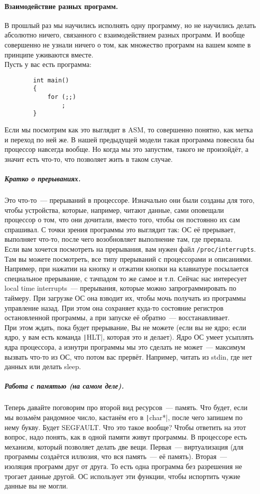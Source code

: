 \documentclass{article}
\begin{document}
    \paragraph{Взаимодействие разных программ.}
    В прошлый раз мы научились исполнять одну программу, но не научились делать абсолютно ничего, связанного с взаимодействием разных программ. И вообще совершенно не узнали ничего о том, как множество программ на вашем компе в принципе уживаются вместе.\\
    Пусть у вас есть программа:
    \begin{verbatim}
        int main()
        {
            for (;;)
                ;
        }
    \end{verbatim}
    Если мы посмотрим как это выглядит в ASM, то совершенно понятно, как метка и переход по ней же. В нашей предыдущей модели такая программа повесила бы процессор навсегда вообще. Но когда мы это запустим, такого не произойдёт, а значит есть что-то, что позволяет жить в таком случае.
    \subparagraph{Кратко о прерываниях.}
    Это что-то~--- прерываний в процессоре. Изначально они были созданы для того, чтобы устройства, которые, например, читают данные, сами оповещали процессор о том, что они дочитали, вместо того, чтобы он постоянно их сам спрашивал. С точки зрения программы это выглядит так: ОС её прерывает, выполняет что-то, после чего возобновляет выполнение там, где прервала.\\
    Если вам хочется посмотреть на прерывания, вам нужен файл \Verb|/proc/interrupts|. Там вы можете посмотреть, все типу прерываний с процессорами и описаниями. Например, при нажатии на кнопку и отжатии кнопки на клавиатуре посылается специальное прерывание, с тачпадом то же самое и т.п. Сейчас нас интересует local time interrupts~--- прерывания, которые можно запрограммировать по таймеру. При загрузке ОС она взводит их, чтобы мочь получать из программы управление назад. При этом она сохраняет куда-то состояние регистров остановленной программы, а при запуске её обратно~--- восстанавливает.\\
    При этом ждать, пока будет прерывание, Вы не можете (если вы не ядро; если ядро, у вам есть команда \texttt|HLT|, которая это и делает). Ядро ОС умеет усыплять ядра процессора, а изнутри программы мы это сделать не может~--- максимум вызвать что-то из ОС, что потом вас прервёт. Например, читать из stdin, где нет данных или делать sleep.
    \subparagraph{Работа с памятью (на самом деле).}
    Теперь давайте поговорим про второй вид ресурсов~--- память. Что будет, если мы возьмём рандомное число, кастанём его в \texttt|char*|, после чего запишем по нему букву. Будет SEGFAULT. Что это такое вообще? Чтобы ответить на этот вопрос, надо понять, как в одной памяти живут программы. В процессоре есть механизм, который позволяет делать две вещи. Первая~--- виртуализация (для программы создаётся иллюзия, что вся память~--- её память). Вторая~--- изоляция программ друг от друга. То есть одна программа без разрешения не трогает данные другой. ОС использует эти функции, чтобы испортить чужие данные вы не могли.\\
\end{document}
